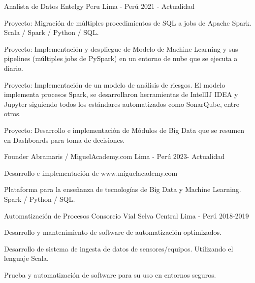 

\begin{cventries}

  \cventry
  {Analista de Datos} %
  {Entelgy Peru} %
  {Lima - Per\'u} %
  {2021 - Actualidad} %
  {
    \begin{cvitems} %
      \item {Proyecto: Migraci\'on de m\'ultiples procedimientos de SQL a jobs de Apache Spark. Scala / Spark / Python / SQL.}
      \item {Proyecto: Implementaci\'on y despliegue de Modelo de Machine Learning y sus pipelines (m\'ultiples jobs de PySpark) en un entorno de nube que se ejecuta a diario.}
      \item {Proyecto: Implementaci\'on de un modelo de an\'alisis de riesgos. El modelo implementa procesos Spark, se desarrollaron herramientas de IntellIJ IDEA y Jupyter siguiendo todos los est\'andares automatizados como SonarQube, entre otros.}
      \item {Proyecto: Desarrollo e implementaci\'on de M\'odulos de Big Data que se resumen en Dashboards para toma de decisiones.}
    \end{cvitems}
  }

  \cventry
  {Founder} %
  {Abramaris / MiguelAcademy.com} %
  {Lima - Per\'u} %
  {2023- Actualidad} %
  {
    \begin{cvitems} %
      \item {Desarrollo e implementaci\'on de www.miguelacademy.com}
      \item {Plataforma para la enseñanza de tecnolog\'ias de Big Data y Machine Learning. Spark / Python / SQL.}
    \end{cvitems}
  }
  \cventry
  {Automatizaci\'on de Procesos} %
  {Consorcio Vial Selva Central} %
  {Lima - Per\'u} %
  {2018-2019} %
  {
    \begin{cvitems} %
      \item {Desarrollo y mantenimiento de software de automatizaci\'on optimizados.}
      \item {Desarrollo de sistema de ingesta de datos de sensores/equipos. Utilizando el lenguaje Scala.}
      \item {Prueba y automatizaci\'on de software para su uso en entornos seguros.}
    \end{cvitems}
  }


\end{cventries}
